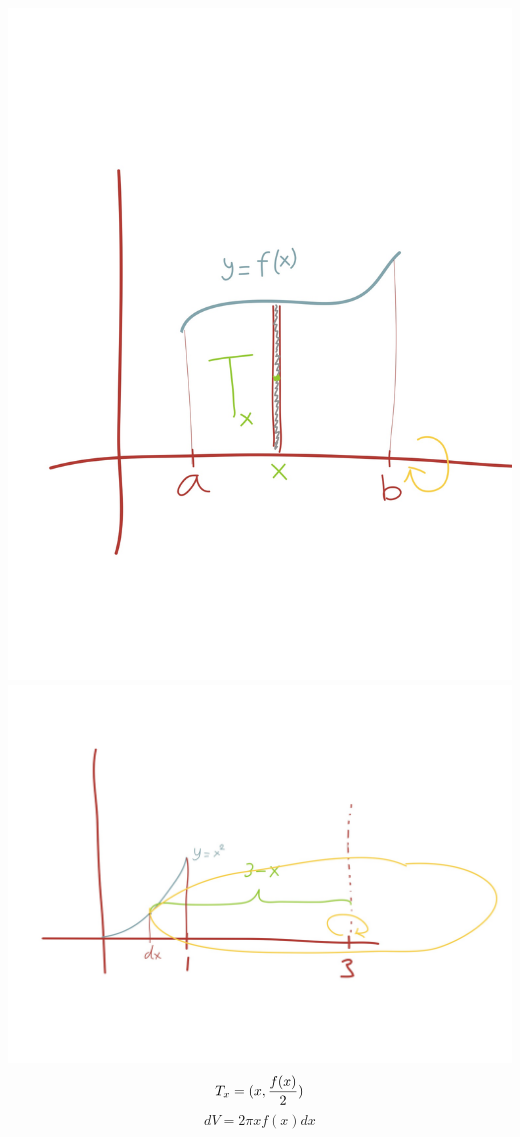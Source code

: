 \documentclass{article}
\begin{document}
\includegraphics[scale=0.10]{img/img1.jpg}
\includegraphics[scale=0.10]{img/img4.jpg}
$$T_x=(x, \frac{f(x)}{2}) $$
$$dV = 2\pi x f(x) dx $$
\end{document}
